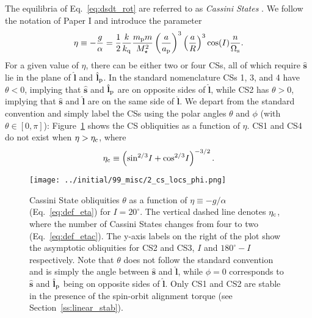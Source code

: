 \documentclass[
        fleqn,
        usenatbib,
        referee
    ]{mnras}
\newcommand*{\p}[1]{\left(#1\right)}
\newcommand*{\s}[1]{\left[#1\right]}
\newcommand*{\uv}[1]{\hat{\boldsymbol{\mathbf{#1}}}}
\newlength{\colummwidth}
\begin{document}
The equilibria of Eq.~\eqref{eq:dsdt_rot} are referred to as \emph{Cassini
States} \citep[CSs;][]{colombo1966, peale1969}. We follow the notation of
Paper I and introduce the parameter
\begin{equation}
    \eta \equiv -\frac{g}{\alpha} =
        \frac{1}{2}\frac{k}{k_{\rm q}}
            \frac{m_{\rm p}m}{M_\star^2}
            \p{\frac{a}{a_{\rm p}}}^3
            \p{\frac{a}{R}}^3\cos(I)
            \frac{n}{\Omega_{\rm s}}.\label{eq:def_eta}
\end{equation}
For a given value of $\eta$, there can be either two or four CSs, all of which
require $\uv{s}$ lie in the plane of $\uv{l}$ and $\uv{l}_{\rm p}$. In
the standard nomenclature CSs 1, 3, and 4 have $\theta < 0$, implying that $\uv{s}$ and $\uv{l}_{\rm p}$ are on opposite sides
of $\uv{l}$, while CS2 has $\theta > 0$, implying that $\uv{s}$ and $\uv{l}$ are
on the same side of $\uv{l}$. We depart from the standard convention and simply
label the CSs using the polar angles $\theta$ and $\phi$ (with $\theta \in \s{0,
\pi}$): Figure~\ref{fig:cs_locs} shows the CS obliquities as a function of
$\eta$. CS1 and CS4 do not exist when $\eta > \eta_{\rm c}$, where
\begin{equation}
    \eta_{\rm c} \equiv \p{\sin^{2/3}\!I + \cos^{2/3}\!I}^{-3/2}.
        \label{eq:def_etac}
\end{equation}
\begin{figure}
    \centering
    \texttt{[image: ../initial/99\_misc/2\_cs\_locs\_phi.png]}
    \caption{Cassini State obliquities $\theta$ as a function of $\eta \equiv
    -g/\alpha$ (Eq.~\ref{eq:def_eta}) for $I = 20^\circ$. The vertical dashed
    line denotes $\eta_{\rm c}$, where the number of Cassini States changes from
    four to two (Eq.~\ref{eq:def_etac}). The y-axis labels on the right of
    the plot show the asymptotic obliquities for CS2 and CS3, $I$ and $180^\circ
    - I$ respectively. Note that $\theta$ does not follow the standard
    convention \citep[e.g.][]{colombo1966} and is simply the angle between
    $\uv{s}$ and $\uv{l}$, while $\phi = 0$ corresponds to $\uv{s}$ and
    $\uv{l}_{\rm p}$ being on opposite sides of $\uv{l}$. Only CS1 and CS2 are
    stable in the presence of the spin-orbit alignment torque (see
    Section~\ref{ss:linear_stab}).}\label{fig:cs_locs}
\end{figure}
\end{document}
